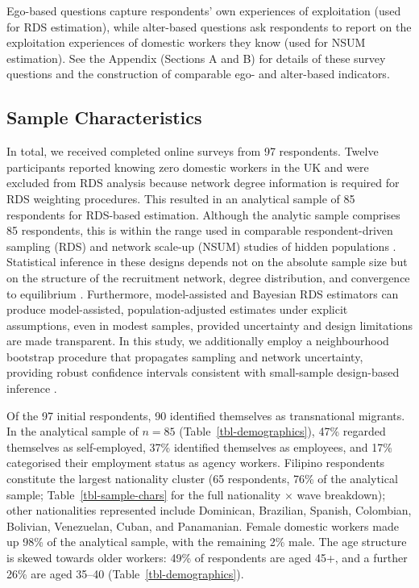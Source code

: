 \documentclass[
  12pt,
  letterpaper,
  DIV=11,
  numbers=noendperiod]{scrartcl}
\begin{document}
Ego-based questions capture respondents' own experiences of exploitation
(used for RDS estimation), while alter-based questions ask respondents
to report on the exploitation experiences of domestic workers they know
(used for NSUM estimation). See the Appendix (Sections A and B) for
details of these survey questions and the construction of comparable
ego- and alter-based indicators.

\subsection{Sample Characteristics}\label{sec-sample-characteristics}

In total, we received completed online surveys from 97 respondents.
Twelve participants reported knowing zero domestic workers in the UK and
were excluded from RDS analysis because network degree information is
required for RDS weighting procedures. This resulted in an analytical
sample of 85 respondents for RDS-based estimation. Although the analytic
sample comprises 85 respondents, this is within the range used in
comparable respondent-driven sampling (RDS) and network scale-up (NSUM)
studies of hidden populations
\autocite{gile10-respondentdriven,goel10-assessing,gile11-improved}.
Statistical inference in these designs depends not on the absolute
sample size but on the structure of the recruitment network, degree
distribution, and convergence to equilibrium \autocite{salg04-sampling}.
Furthermore, model-assisted and Bayesian RDS estimators
\autocite{gile11-improved,gile18-methods} can produce model-assisted,
population-adjusted estimates under explicit assumptions, even in modest
samples, provided uncertainty and design limitations are made
transparent. In this study, we additionally employ a neighbourhood
bootstrap procedure that propagates sampling and network uncertainty,
providing robust confidence intervals consistent with small-sample
design-based inference \autocite{hand14-estimating}.

Of the 97 initial respondents, 90 identified themselves as transnational
migrants. In the analytical sample of \(n = 85\)
(Table~\ref{tbl-demographics}), 47\% regarded themselves as
self-employed, 37\% identified themselves as employees, and 17\%
categorised their employment status as agency workers. Filipino
respondents constitute the largest nationality cluster (65 respondents,
76\% of the analytical sample; Table~\ref{tbl-sample-chars} for the full
nationality × wave breakdown); other nationalities represented include
Dominican, Brazilian, Spanish, Colombian, Bolivian, Venezuelan, Cuban,
and Panamanian. Female domestic workers made up 98\% of the analytical
sample, with the remaining 2\% male. The age structure is skewed towards
older workers: 49\% of respondents are aged 45+, and a further 26\% are
aged 35--40 (Table~\ref{tbl-demographics}).
\end{document}
